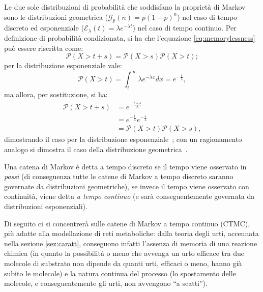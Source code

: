 	Le due sole distribuzioni di probabilit\`a che soddisfano la propriet\`a di Markov sono le distribuzioni geometrica ($\mathcal{G}_p(n) = p(1 - p)^n$) nel caso di tempo discreto ed esponenziale ($\mathcal{E}_\lambda(t) = \lambda e^{-\lambda t}$) nel caso di tempo continuo.
	Per definizione di probabilit\`a condizionata, si ha che l'equazione \ref{eq:memorylessness} pu\`o essere riscritta come:
	\begin{equation*}
		\mathcal{P}(X > t + s) = \mathcal{P} (X > s) \mathcal{P}(X > t);
	\end{equation*}
	per la distribuzione esponenziale vale:
	\begin{equation*}
		\mathcal{P}(X > t) = \int_{t}^{\infty} \lambda e^{-\lambda x} dx = e^{-\frac{t}{\lambda}},
	\end{equation*}
	ma allora, per sostituzione, si ha:
	\begin{align*}
		\mathcal{P}(X > t + s) &= e^{-\frac{t + s}{\lambda}}\\
		&= e^{-\frac{t}{\lambda}} e^{-\frac{s}{\lambda}}\\
		&= \mathcal{P} (X > t) \mathcal{P}(X > s),
	\end{align*}
	dimostrando il caso per la distribuzione esponenziale~\cite{expforgetfulness}; con un ragionamento analogo si dimostra il caso della distribuzione geometrica~\cite{geomforgetfulness}.

	Una catena di Markov \`e detta a tempo discreto se il tempo viene osservato in \emph{passi} (di conseguenza tutte le catene di Markov a tempo discreto saranno governate da distribuzioni geometriche), se invece il tempo viene osservato con continuit\`a, viene detta \emph{a tempo continuo} (e sar\`a conseguentemente governata da distribuzioni esponenziali).
	
	Di seguito ci si concentrer\`a sulle catene di Markov a tempo continuo (CTMC), pi\`u adatte alla modellazione di reti metaboliche: dalla teoria degli urti, accennata nella sezione \ref{sez:caratt}, conseguono infatti l'assenza di memoria di una reazione chimica (in quanto la possibilit\`a o meno che avvenga un urto efficace tra due molecole di substrato non dipende da quanti urti, efficaci o meno, hanno gi\`a subito le molecole) e la natura continua del processo (lo spostamento delle molecole, e conseguentemente gli urti, non avvengono ``a scatti'').
	
